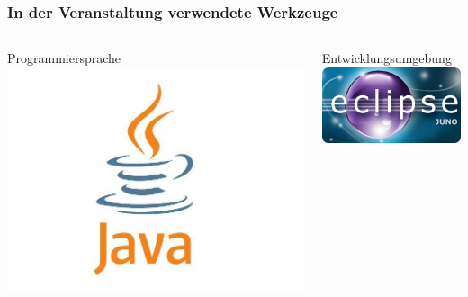 \begin{frame}
\frametitle{In der Veranstaltung verwendete Werkzeuge}
	\begin{columns}[T]
	    \begin{column}{.5\textwidth}
	    	\begin{block}{Programmiersprache}
	    		\center
	    		\includegraphics[width=1\textwidth, keepaspectratio=true]{bilder/java.jpeg}
	    	\end{block}
	    \end{column}
	    \begin{column}{.5\textwidth}
	     	\begin{block}{Entwicklungsumgebung}
	     		\center
	     		\includegraphics[width=1\textwidth, keepaspectratio=true]{bilder/eclipse.jpg}
	    	\end{block}
	    \end{column}
	\end{columns}
\end{frame}
 
